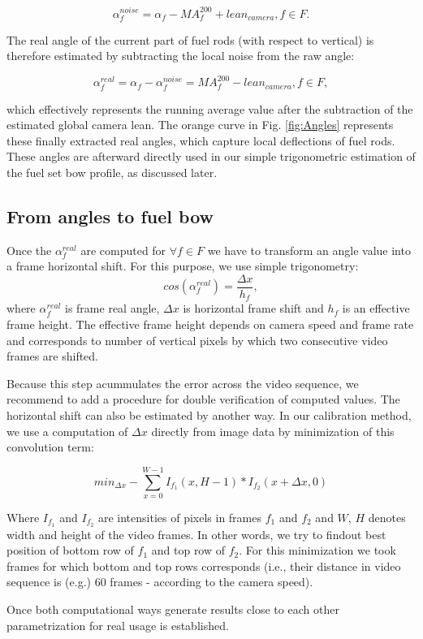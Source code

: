 \documentclass[preprint,12pt]{elsarticle}
\begin{document}
\[\alpha_f^{noise} = \alpha_f - MA_f^{200} + lean_{camera}, f \in F. \]

The real angle of the current part of fuel rods (with respect to vertical) is therefore estimated by subtracting the local noise from the raw angle:

\[\alpha_f^{real} = \alpha_f - \alpha_f^{noise} = MA_f^{200} - lean_{camera}, f \in F, \]

which effectively represents the running average value after the subtraction of the estimated global camera lean. The orange curve in Fig. \ref{fig:Angles} represents these finally extracted real angles, which capture local deflections of fuel rods. These angles are afterward directly used in our simple trigonometric estimation of the fuel set bow profile, as discussed later.

\subsection{From angles to fuel bow}

Once the $\alpha^{real}_f$ are computed for $\forall f \in F$ we have to transform an angle value into a frame horizontal shift. For this purpose, we use simple trigonometry:
$$
cos(\alpha_f^{real}) = \frac{\Delta x}{h_f},
$$
where $\alpha_f^{real}$ is frame real angle, $\Delta x$ is horizontal frame shift and $h_f$ is an effective frame height. The effective frame height depends on camera speed and frame rate and corresponds to number of vertical pixels by which two consecutive video frames are shifted.

Because this step acummulates the error across the video sequence, we recommend to add a procedure for double verification of computed values. The horizontal shift can also be estimated by another way. In our calibration method, we use a computation of $\Delta x$ directly from image data by minimization of this  convolution term:

$$
min_{\Delta x} -\sum_{x=0}^{W-1}I_{f_1}(x, H-1) * I_{f_2}(x + \Delta x, 0)
$$

Where $I_{f_1}$ and $I_{f_2}$ are intensities of pixels in frames $f_1$ and $f_2$ and $W$, $H$ denotes width and height of the video frames. In other words, we try to findout best position of bottom row of $f_1$ and top row of $f_2$. For this minimization we took frames for which bottom and top rows corresponds (i.e., their distance in video sequence is (e.g.) 60 frames - according to the camera speed).

Once both computational ways generate results close to each other parame\-trization for real usage is established.
\end{document}
